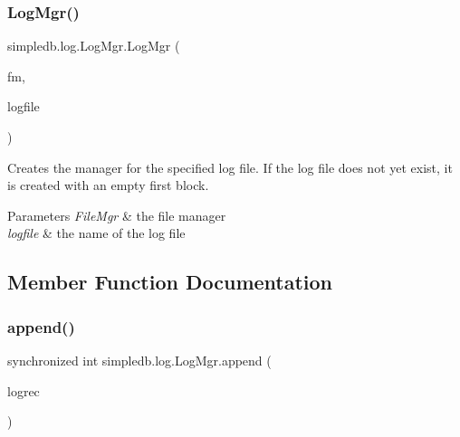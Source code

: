 \subsubsection{\texorpdfstring{Log\+Mgr()}{LogMgr()}}
{\footnotesize\ttfamily simpledb.\+log.\+Log\+Mgr.\+Log\+Mgr (\begin{DoxyParamCaption}\item[{\hyperlink{classsimpledb_1_1file_1_1FileMgr}{File\+Mgr}}]{fm,  }\item[{String}]{logfile }\end{DoxyParamCaption})\hspace{0.3cm}{\ttfamily [inline]}}

Creates the manager for the specified log file. If the log file does not yet exist, it is created with an empty first block. 
\begin{DoxyParams}{Parameters}
{\em File\+Mgr} & the file manager \\
\hline
{\em logfile} & the name of the log file \\
\hline
\end{DoxyParams}


\subsection{Member Function Documentation}
\mbox{\label{classsimpledb_1_1log_1_1LogMgr_ae147d7c57574b8c580b8cac41d112727}} 
\subsubsection{\texorpdfstring{append()}{append()}}
{\footnotesize\ttfamily synchronized int simpledb.\+log.\+Log\+Mgr.\+append (\begin{DoxyParamCaption}\item[{byte \mbox{[}$\,$\mbox{]}}]{logrec }\end{DoxyParamCaption})\hspace{0.3cm}{\ttfamily [inline]}}

